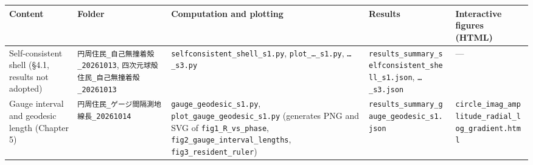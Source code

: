 \documentclass[
  a4paper,
]{article}
\newcounter{none} %
\begin{document}
{\def\LTcaptype{none} %
\begin{longtable}[]{@{}
  >{\raggedright\arraybackslash}p{}
  >{\raggedright\arraybackslash}p{}
  >{\raggedright\arraybackslash}p{}
  >{\raggedright\arraybackslash}p{}
  >{\raggedright\arraybackslash}p{}@{}}
\toprule\noalign{}
\begin{minipage}[b]{\linewidth}\raggedright
Content
\end{minipage} & \begin{minipage}[b]{\linewidth}\raggedright
Folder
\end{minipage} & \begin{minipage}[b]{\linewidth}\raggedright
Computation and plotting
\end{minipage} & \begin{minipage}[b]{\linewidth}\raggedright
Results
\end{minipage} & \begin{minipage}[b]{\linewidth}\raggedright
Interactive figures (HTML)
\end{minipage} \\
\midrule\noalign{}
\endhead
\bottomrule\noalign{}
\endlastfoot
Self-consistent shell (§4.1, results not adopted) &
\texttt{円周住民\_\allowbreak{}自己無撞着殻\_\allowbreak{}20261013},
\texttt{四次元球殻住民\_\allowbreak{}自己無撞着殻\_\allowbreak{}20261013} &
\texttt{selfconsistent\_\allowbreak{}shell\_\allowbreak{}s1.py}, \texttt{plot\_\allowbreak{}…\_\allowbreak{}s1.py},
\texttt{…\_\allowbreak{}s3.py} &
\texttt{results\_\allowbreak{}summary\_\allowbreak{}selfconsistent\_\allowbreak{}shell\_\allowbreak{}s1.json},
\texttt{…\_\allowbreak{}s3.json} & --- \\
Gauge interval and geodesic length (Chapter 5) &
\texttt{円周住民\_\allowbreak{}ゲージ間隔測地線長\_\allowbreak{}20261014} &
\texttt{gauge\_\allowbreak{}geodesic\_\allowbreak{}s1.py}, \texttt{plot\_\allowbreak{}gauge\_\allowbreak{}geodesic\_\allowbreak{}s1.py}
(generates PNG and SVG of \texttt{fig1\_\allowbreak{}R\_\allowbreak{}vs\_\allowbreak{}phase},
\texttt{fig2\_\allowbreak{}gauge\_\allowbreak{}interval\_\allowbreak{}lengths}, \texttt{fig3\_\allowbreak{}resident\_\allowbreak{}ruler})
& \texttt{results\_\allowbreak{}summary\_\allowbreak{}gauge\_\allowbreak{}geodesic\_\allowbreak{}s1.json} &
\texttt{circle\_\allowbreak{}imag\_\allowbreak{}amplitude\_\allowbreak{}radial\_\allowbreak{}log\_\allowbreak{}gradient.html} \\

\end{longtable}}
\end{document}
